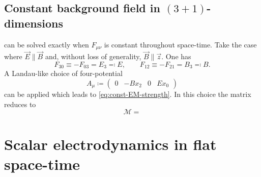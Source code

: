 \documentclass[12pt]{article}
\newcommand\mi{\mathrm{i}} %
\newcommand\me{\mathrm{e}} %
\newcommand\dif{\mathrm{d}}
\DeclareMathOperator{\Tr}{Tr}
\newcommand{\rbr}[1]{{\left(#1\right)}}
\newcommand{\rfun}[2]{{#1}\mathopen{}\left(#2\right)\mathclose{}}
\newcommand{\sfun}[2]{{#1}\mathopen{}\left[#2\right]\mathclose{}}
\begin{document}
\subsection{Constant background field in $\rbr{3+1}$-dimensions}

 can be solved exactly when $F_{\mu\nu}$ is constant throughout 
space-time. Take the case \citep{resetsky2012} where $\vec{E}\parallel\vec{B}$ 
and, without loss of generality, $\vec{B}\parallel\vec{z}$. One has
\begin{equation}
F_{30} \equiv -F_{03} = E_3 \eqqcolon E,\qquad
F_{12} \equiv -F_{21} = B_3 \eqqcolon B.
\label{eq:const-EM-strength}
\end{equation}
A Landau-like choice of four-potential \citep{landau1930}
\begin{equation}
A_{\mu} \coloneqq \begin{pmatrix} 0 & -Bx_2 & 0 & Ex_0 \end{pmatrix}
\end{equation}
can be applied which leads to \cref{eq:const-EM-strength}. In this choice the
matrix reduces to
\begin{equation}
\mathcal{M} = 
\end{equation}

\cite{heisenberg1936}



\section{Scalar electrodynamics in flat space-time}
\end{document}
